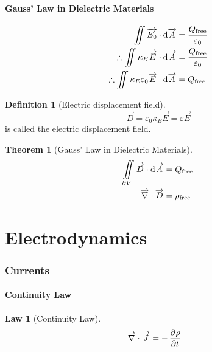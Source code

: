 \documentclass[fleqn, a4paper, 8pt, twoside]{amsart}
\theoremstyle{definition}
\newtheorem{definition}{Definition}
\theoremstyle{theorem}
\newtheorem{theorem}{Theorem}
\newtheorem{law}{Law}
\begin{document}
\begin{multicols}{2}
\begin{spacing}{0.6}
\subsection{Gauss' Law in Dielectric Materials}

\begin{align*}
	\iint \overrightarrow{E_0} \cdot \dif \overrightarrow{A}                                 & = \frac{Q_{\textnormal{free}}}{\varepsilon_0} \\
	\therefore \iint \kappa_E \overrightarrow{E} \cdot \dif \overrightarrow{A}               & = \frac{Q_{\textnormal{free}}}{\varepsilon_0} \\
	\therefore \iint \kappa_E \varepsilon_0 \overrightarrow{E} \cdot \dif \overrightarrow{A} & = Q_{\textnormal{free}}
\end{align*}

\begin{definition}[Electric displacement field]
	\begin{equation*}
		\overrightarrow{D} = \varepsilon_0 \kappa_E \overrightarrow{E} = \varepsilon \overrightarrow{E}
	\end{equation*}
	is called the electric displacement field.
\end{definition}

\begin{theorem}[Gauss' Law in Dielectric Materials]
	\begin{align*}
		\iint\limits_{\partial V} \overrightarrow{D} \cdot \dif \overrightarrow{A} & = Q_{\textnormal{free}} \\
		\overrightarrow{\nabla} \cdot \overrightarrow{D}                           & = \rho_{\textnormal{free}}
	\end{align*}
	\label{Gauss'_Law_in_Dielectric_Materials}
\end{theorem}

\part{Electrodynamics}

\section{Currents}

\subsection{Continuity Law}

\begin{law}[Continuity Law]
	\begin{align*}
		\overrightarrow{\nabla} \cdot \overrightarrow{J} & = -\dpd{\rho}{t}
	\end{align*}
\end{law}


\end{spacing}
\end{multicols}
\end{document}
